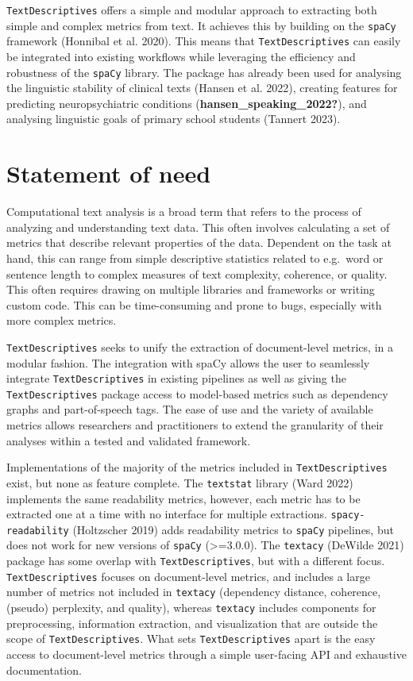 \documentclass[
]{article}
\begin{document}
\texttt{TextDescriptives} offers a simple and modular approach to
extracting both simple and complex metrics from text. It achieves this
by building on the \texttt{spaCy} framework (Honnibal et al. 2020). This
means that \texttt{TextDescriptives} can easily be integrated into
existing workflows while leveraging the efficiency and robustness of the
\texttt{spaCy} library. The package has already been used for analysing
the linguistic stability of clinical texts (Hansen et al. 2022),
creating features for predicting neuropsychiatric conditions
(\textbf{hansen\_speaking\_2022?}), and analysing linguistic goals of
primary school students (Tannert 2023).

\hypertarget{statement-of-need}{%
\section{Statement of need}\label{statement-of-need}}

Computational text analysis is a broad term that refers to the process
of analyzing and understanding text data. This often involves
calculating a set of metrics that describe relevant properties of the
data. Dependent on the task at hand, this can range from simple
descriptive statistics related to e.g.~word or sentence length to
complex measures of text complexity, coherence, or quality. This often
requires drawing on multiple libraries and frameworks or writing custom
code. This can be time-consuming and prone to bugs, especially with more
complex metrics.

\texttt{TextDescriptives} seeks to unify the extraction of
document-level metrics, in a modular fashion. The integration with spaCy
allows the user to seamlessly integrate \texttt{TextDescriptives} in
existing pipelines as well as giving the \texttt{TextDescriptives}
package access to model-based metrics such as dependency graphs and
part-of-speech tags. The ease of use and the variety of available
metrics allows researchers and practitioners to extend the granularity
of their analyses within a tested and validated framework.

Implementations of the majority of the metrics included in
\texttt{TextDescriptives} exist, but none as feature complete. The
\texttt{textstat} library (Ward 2022) implements the same readability
metrics, however, each metric has to be extracted one at a time with no
interface for multiple extractions. \texttt{spacy-readability}
(Holtzscher 2019) adds readability metrics to \texttt{spaCy} pipelines,
but does not work for new versions of \texttt{spaCy}
(\textgreater=3.0.0). The \texttt{textacy} (DeWilde 2021) package has
some overlap with \texttt{TextDescriptives}, but with a different focus.
\texttt{TextDescriptives} focuses on document-level metrics, and
includes a large number of metrics not included in \texttt{textacy}
(dependency distance, coherence, (pseudo) perplexity, and quality),
whereas \texttt{textacy} includes components for preprocessing,
information extraction, and visualization that are outside the scope of
\texttt{TextDescriptives}. What sets \texttt{TextDescriptives} apart is
the easy access to document-level metrics through a simple user-facing
API and exhaustive documentation.
\end{document}

